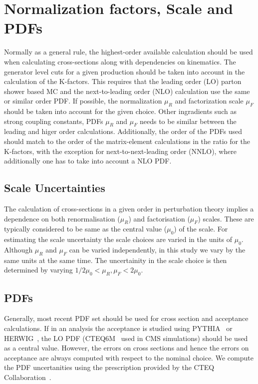 \section{Normalization factors, Scale and PDFs}
\label{sec:normalization}

Normally as a general rule, the highest-order available calculation should be used when calculating cross-sections 
along with dependencies on kinematics. The generator level cuts for a given production should be taken into
account in the calculation of the K-factors. This requires that the leading order (LO) parton shower based MC and the 
next-to-leading order (NLO) calculation use the same or similar order PDF. If possible, the normalization $\mu_R$ and 
factorization scale $\mu_F$ should be taken into account for the given choice. Other ingradients such as strong 
coupling constants, PDFs $\mu_R$ and $\mu_F$ needs to be similar between the leading and higer order calculations. 
Additionally, the order of the PDFs used should match to the order of the matrix-element calculations in the 
ratio for the K-factors, with the exception for next-to-next-leading order (NNLO), where additionally one has 
to take into account a NLO PDF. 

\subsection{Scale Uncertainties}

The calculation of cross-sections in a given order in perturbation theory implies a dependence on both 
renormalisation ($\mu_R$) and factorisation ($\mu_F$) scales. These are typically considered to be same 
as the central value ($\mu_0$) of the scale.  For estimating the scale uncertainty the scale choices are varied 
in the units of $\mu_0$. Although $\mu_R$ and $\mu_F$ can be varied independently, in this study
we vary by the same units at the same time. The uncertainity in the scale choice is then determined
by varying $1/2 \mu_0 < \mu_R, \mu_F < 2\mu_0$. 

\subsection{PDFs}

Generally, most recent PDF set should be used for cross section and acceptance calculations. If in an analysis 
the acceptance is studied using PYTHIA~\cite{Pythia} or HERWIG~\cite{Herwig}, the LO PDF (CTEQ6M~\cite{cteq6m} used 
in CMS simulations) should be used as a central value. However, the errors on cross sections and hence the errors on 
acceptance are always computed with respect to the nominal choice. We compute the PDF
uncertanities using the prescription provided by the CTEQ Collaboration~\cite{cteq6m}. 

